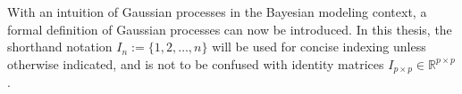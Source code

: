 			With an intuition of Gaussian processes in the Bayesian modeling context, a formal definition of Gaussian processes can now be introduced. In this thesis, the shorthand notation $I_{n} := \{1, 2, \dots, n\}$ will be used for concise indexing unless otherwise indicated, and is not to be confused with identity matrices $I_{p \times p} \in \mathbb{R}^{p \times p}$.
			
%					
%			
%
			

